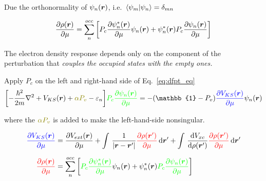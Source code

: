 \begin{frame}[allowframebreaks]
  Due the orthonormality of $\psi_n(\boldsymbol{r})$, i.e.\ $\braket{\psi_m | \psi_n} = \delta_{mn}$

  \begin{equation}
    \label{eq:density_response}
    \frac{
      \partial \rho(\boldsymbol{r})
    }{
      \partial \mu
    }
    =
    \sum_n^{occ}
    \left[
      P_c
        \frac{
        \partial \psi_n^*(\boldsymbol{r})
        }{
        \partial \mu
        }
        \psi_n(\boldsymbol{r})
        +
        \psi_n^*(\boldsymbol{r})
        P_c
        \frac{
        \partial \psi_n(\boldsymbol{r})
        }{
        \partial \mu
        }
    \right]
  \end{equation}

  The electron density response depends only on the component of the
  perturbation that \emph{ couples the occupied states with the empty ones.}

  \break

  Apply $P_c$ on the left and right-hand side of Eq.~\ref{eq:dfpt_eq}
  \begin{equation}
    \label{eq:dfpt_eq_final}
    \biggl[
    -{\hbar^2\over2m}\nabla^2 + V_{KS}(\boldr)
    +
    \mathcolor{olive}{
      \alpha P_v
    }
    - \varepsilon_n
    \biggr]
    \mathcolor{green}{
        P_c
        \frac{
        \partial \psi_n(\boldr)
        }{
        \partial\mu
        }
    }
    =
    -(\mathbb{1} - P_v)
    \mathcolor{blue}{
    \frac{
      \partial V_{KS}(\boldr)
    }{
      \partial\mu
    }
    }
    \psi_n(\boldr)
  \end{equation}

  where the $\mathcolor{olive}{\alpha P_v}$ is added to make the left-hand-side nonsingular.

  \begin{align}
    \mathcolor{blue}{
    \frac{
      \partial V_{KS}(\boldr)
    }{
      \partial \mu
    }}
    &=
    \frac{
      \partial V_{ext}(\boldr)
    }{
      \partial \mu
    }
    +
    \int\, \frac{
      1
    }{
      |\boldr - \boldr'|
    }
    \mathcolor{red}{
      \frac{
      \partial \rho(\boldr')
      }{
      \partial \mu
    }} \, \mathrm{d}\boldr'
    +
    \int\,
    \frac{
      \mathrm{d} V_{xc}
    }{
      \mathrm{d} \rho(\boldr')
    }
    \mathcolor{red}{
      \frac{
      \partial \rho(\boldr')
      }{
      \partial \mu
    }} \, \mathrm{d}\boldr'
    \label{eq:perturbation_final}
    \\[6pt]
    \mathcolor{red}{
        \frac{
        \partial \rho(\boldr)
        }{
        \partial \mu
        }
    }
    &=
    \sum_n^{occ}
    \left[
      \mathcolor{green}{
        P_c
        \frac{
        \partial \psi_n^*(\boldr)
        }{
        \partial \mu
        }
      }
      \psi_n(\boldr)
      +
      \psi_n^*(\boldr)
      \mathcolor{green}{
        P_c
        \frac{
        \partial \psi_n(\boldr)
        }{
        \partial \mu
        }
      }
    \right]
    \nonumber
  \end{align}



\end{frame}
